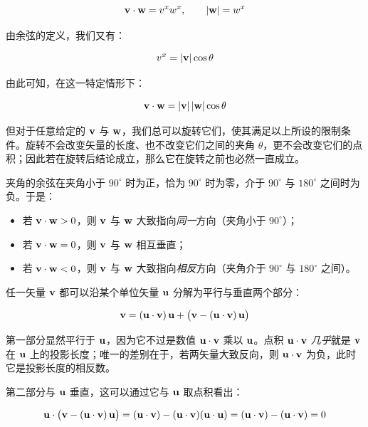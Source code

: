 \begin{equation}
\mathbf{v}\cdot\mathbf{w} = v^{x}w^{x}, \qquad |\mathbf{w}| = w^{x}
\end{equation}

由余弦的定义，我们又有：

\begin{equation}
v^{x} = |\mathbf{v}|\cos\theta
\end{equation}

由此可知，在这一特定情形下：

\begin{equation}
\mathbf{v}\cdot\mathbf{w} = |\mathbf{v}|\,|\mathbf{w}|\cos\theta
\end{equation}

但对于任意给定的 $\mathbf{v}$ 与 $\mathbf{w}$，我们总可以旋转它们，使其满足以上所设的限制条件。旋转不会改变矢量的长度、也不改变它们之间的夹角 $\theta$，更不会改变它们的点积；因此若在旋转后结论成立，那么它在旋转之前也必然一直成立。

夹角的余弦在夹角小于 $90^\circ$ 时为正，恰为 $90^\circ$ 时为零，介于 $90^\circ$ 与 $180^\circ$ 之间时为负。于是：

\begin{itemize}
  \item 若 $\mathbf{v}\cdot\mathbf{w} > 0$，则 $\mathbf{v}$ 与 $\mathbf{w}$ 大致指向\emph{同一}方向（夹角小于 $90^\circ$）；
  \item 若 $\mathbf{v}\cdot\mathbf{w} = 0$，则 $\mathbf{v}$ 与 $\mathbf{w}$ 相互垂直；
  \item 若 $\mathbf{v}\cdot\mathbf{w} < 0$，则 $\mathbf{v}$ 与 $\mathbf{w}$ 大致指向\emph{相反}方向（夹角介于 $90^\circ$ 与 $180^\circ$ 之间）。
\end{itemize}

任一矢量 $\mathbf{v}$ 都可以沿某个单位矢量 $\mathbf{u}$ 分解为平行与垂直两个部分：

\begin{equation}
\mathbf{v} = (\mathbf{u}\cdot\mathbf{v})\,\mathbf{u} + \bigl(\mathbf{v} - (\mathbf{u}\cdot\mathbf{v})\,\mathbf{u}\bigr)
\end{equation}

第一部分显然平行于 $\mathbf{u}$，因为它不过是数值 $\mathbf{u}\cdot\mathbf{v}$ 乘以 $\mathbf{u}$。点积 $\mathbf{u}\cdot\mathbf{v}$ \emph{几乎}就是 $\mathbf{v}$ 在 $\mathbf{u}$ 上的投影长度；唯一的差别在于，若两矢量大致反向，则 $\mathbf{u}\cdot\mathbf{v}$ 为负，此时它是投影长度的相反数。

第二部分与 $\mathbf{u}$ 垂直，这可以通过它与 $\mathbf{u}$ 取点积看出：

\begin{equation}
\mathbf{u}\cdot\bigl(\mathbf{v} - (\mathbf{u}\cdot\mathbf{v})\,\mathbf{u}\bigr)
= (\mathbf{u}\cdot\mathbf{v}) - (\mathbf{u}\cdot\mathbf{v})(\mathbf{u}\cdot\mathbf{u})
= (\mathbf{u}\cdot\mathbf{v}) - (\mathbf{u}\cdot\mathbf{v})
= 0
\end{equation}

